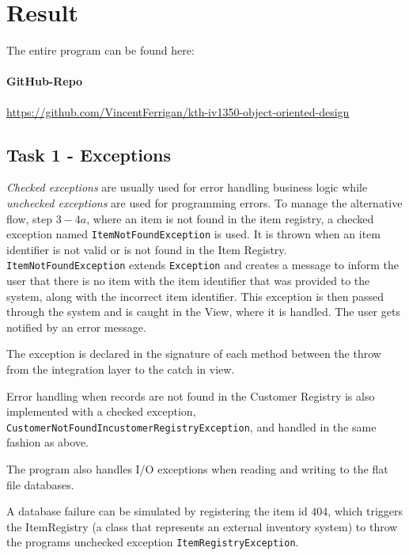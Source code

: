 \documentclass[a4paper]{scrreprt}
\begin{document}
\newpage
\chapter{Result}
\label{sec:result}
The entire program can be found here:

\subsubsection*{GitHub-Repo}
\url{https://github.com/VincentFerrigan/kth-iv1350-object-oriented-design}

\section*{Task 1 - Exceptions}
\emph{Checked exceptions} are usually used for error handling business logic while
\emph{unchecked exceptions} are used for programming errors.
To manage the alternative flow, step $3-4a$,
where an item is not found in the item registry,
a checked exception named \texttt{ItemNotFoundException} is used.
It is thrown when an item identifier is not valid or is not found in the Item Registry.
\texttt{ItemNotFoundException} extends \texttt{Exception}
and creates a message to inform the user that there is no
item with the item identifier that was provided to the system, along with the incorrect item
identifier.
This exception is then passed through the system and is caught in the View, where it is
handled.
The user gets notified by an error message.

The exception is declared in the signature of each method between the throw from the
integration layer %
to the catch in view.

Error handling when records are not found in the Customer Registry is
also implemented with
a checked exception, \texttt{CustomerNotFoundIncustomerRegistryException},
and handled in the same fashion as above.

The program also handles I/O exceptions when reading and writing to the flat file databases.

A database failure can be simulated by registering the item id $404$,
which triggers the ItemRegistry (a class that represents an external inventory system)
to throw the programs unchecked exception \texttt{ItemRegistryException}.
\end{document}

